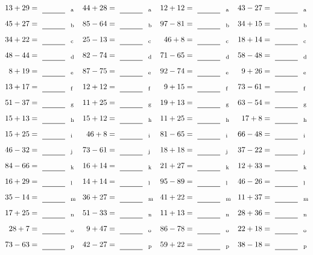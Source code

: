 \documentclass
[
  draft    = true,
  fontsize = 11pt,
  parskip  = half-
]
{scrartcl}
\begin{document}
\clearpage
\begin{align*}
    \pline{13+29}&=\rline{a}
  & \pline{44+28}&=\rline{a}
  & \pline{12+12}&=\rline{a}
  & \pline{43-27}&=\rline{a} \\[1ex]
    \pline{45+27}&=\rline{b}
  & \pline{85-64}&=\rline{b}
  & \pline{97-81}&=\rline{b}
  & \pline{34+15}&=\rline{b} \\[1ex]
    \pline{34+22}&=\rline{c}
  & \pline{25-13}&=\rline{c}
  & \pline{46+8}&=\rline{c}
  & \pline{18+14}&=\rline{c} \\[1ex]
    \pline{48-44}&=\rline{d}
  & \pline{82-74}&=\rline{d}
  & \pline{71-65}&=\rline{d}
  & \pline{58-48}&=\rline{d} \\[1ex]
    \pline{8+19}&=\rline{e}
  & \pline{87-75}&=\rline{e}
  & \pline{92-74}&=\rline{e}
  & \pline{9+26}&=\rline{e} \\[1ex]
    \pline{13+17}&=\rline{f}
  & \pline{12+12}&=\rline{f}
  & \pline{9+15}&=\rline{f}
  & \pline{73-61}&=\rline{f} \\[1ex]
    \pline{51-37}&=\rline{g}
  & \pline{11+25}&=\rline{g}
  & \pline{19+13}&=\rline{g}
  & \pline{63-54}&=\rline{g} \\[1ex]
    \pline{15+13}&=\rline{h}
  & \pline{15+12}&=\rline{h}
  & \pline{11+25}&=\rline{h}
  & \pline{17+8}&=\rline{h} \\[1ex]
    \pline{15+25}&=\rline{i}
  & \pline{46+8}&=\rline{i}
  & \pline{81-65}&=\rline{i}
  & \pline{66-48}&=\rline{i} \\[1ex]
    \pline{46-32}&=\rline{j}
  & \pline{73-61}&=\rline{j}
  & \pline{18+18}&=\rline{j}
  & \pline{37-22}&=\rline{j} \\[1ex]
    \pline{84-66}&=\rline{k}
  & \pline{16+14}&=\rline{k}
  & \pline{21+27}&=\rline{k}
  & \pline{12+33}&=\rline{k} \\[1ex]
    \pline{16+29}&=\rline{l}
  & \pline{14+14}&=\rline{l}
  & \pline{95-89}&=\rline{l}
  & \pline{46-26}&=\rline{l} \\[1ex]
    \pline{35-14}&=\rline{m}
  & \pline{36+27}&=\rline{m}
  & \pline{41+22}&=\rline{m}
  & \pline{11+37}&=\rline{m} \\[1ex]
    \pline{17+25}&=\rline{n}
  & \pline{51-33}&=\rline{n}
  & \pline{11+13}&=\rline{n}
  & \pline{28+36}&=\rline{n} \\[1ex]
    \pline{28+7}&=\rline{o}
  & \pline{9+47}&=\rline{o}
  & \pline{86-78}&=\rline{o}
  & \pline{22+18}&=\rline{o} \\[1ex]
    \pline{73-63}&=\rline{p}
  & \pline{42-27}&=\rline{p}
  & \pline{59+22}&=\rline{p}
  & \pline{38-18}&=\rline{p}
\end{align*}
\end{document}
